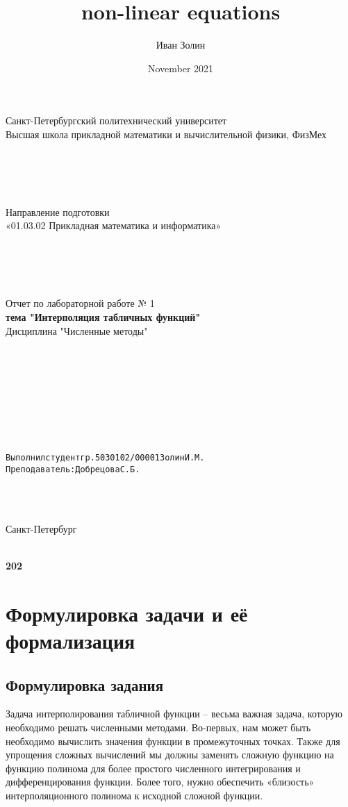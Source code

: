 \documentclass{article}
\title{non-linear equations}
\author{Иван Золин}
\date{November 2021}
\begin{document}
	
	\large
	\begin{center}
		
		Санкт-Петербургский политехнический университет\\
		Высшая школа прикладной математики и вычислительной физики, ФизМех
		
		~\\
		~\\
		~\\
		~\\
		Направление подготовки\\
		«01.03.02 Прикладная математика и информатика»
		
		~\\
		~\\
		~\\
		~\\
		Отчет по лабораторной работе № 1\\
		\textbf{тема "Интерполяция табличных функций" }	
		~\\	Дисциплина "Численные методы"
	\end{center}
	
	~\\
	~\\
	~\\
	~\\
	~\\
	~\\
	~\\
	\begin{alltt}
		Выполнил студент гр. 5030102/00001			  		   		  Золин И.М.
		Преподаватель: 				              	        	Добрецова С.Б.
	\end{alltt}
	
	~\\
	~\\
	\begin{center}
		Санкт-Петербург
		
		~\\
		\textbf{202}
	\end{center}{}
	
	\newpage
	
	\section{Формулировка задачи и её формализация}
	\subsection{Формулировка задания}
	Задача интерполирования табличной функции – весьма важная задача, которую необходимо решать численными методами. Во-первых, нам может быть необходимо вычислить значения функции в промежуточных точках. Также для упрощения сложных вычислений мы должны заменять сложную функцию на функцию полинома для более простого численного интегрирования и дифференцирования функции. Более того, нужно обеспечить «близость» интерполяционного полинома к исходной сложной функции.
\end{document}
